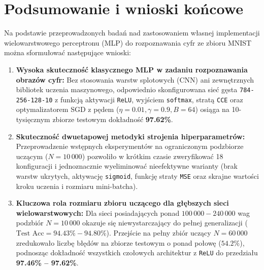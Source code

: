 \documentclass{article}
\begin{document}
\section{Podsumowanie i wnioski końcowe}

Na podstawie przeprowadzonych badań nad zastosowaniem własnej implementacji wielowarstwowego perceptronu (MLP) do rozpoznawania cyfr ze zbioru MNIST można sformułować następujące wnioski:
\begin{enumerate}
    \item \textbf{Wysoka skuteczność klasycznego MLP w zadaniu rozpoznawania obrazów cyfr:} Bez stosowania warstw splotowych (CNN) ani zewnętrznych bibliotek uczenia maszynowego, odpowiednio skonfigurowana sieć gęsta \texttt{784-256-128-10} z funkcją aktywacji \texttt{ReLU}, wyjściem \texttt{softmax}, stratą \texttt{CCE} oraz optymalizatorem SGD z pędem ($\eta = 0.01, \gamma = 0.9, B = 64$) osiąga na 10-tysięcznym zbiorze testowym dokładność \textbf{97.62\%}.
    \item \textbf{Skuteczność dwuetapowej metodyki strojenia hiperparametrów:} Przeprowadzenie wstępnych eksperymentów na ograniczonym podzbiorze uczącym ($N = 10\,000$) pozwoliło w krótkim czasie zweryfikować 18 konfiguracji i jednoznacznie wyeliminować nieefektywne warianty (brak warstw ukrytych, aktywację \texttt{sigmoid}, funkcję straty \texttt{MSE} oraz skrajne wartości kroku uczenia i rozmiaru mini-batcha).
    \item \textbf{Kluczowa rola rozmiaru zbioru uczącego dla głębszych sieci wielowarstwowych:} Dla sieci posiadających ponad $100\,000 - 240\,000$ wag podzbiór $N = 10\,000$ okazuje się niewystarczający do pełnej generalizacji ($\text{Test Acc} = 94.43\% - 94.80\%$). Przejście na pełny zbiór uczący $N = 60\,000$ zredukowało liczbę błędów na zbiorze testowym o ponad połowę ($54.2\%$), podnosząc dokładność wszystkich czołowych architektur z \texttt{ReLU} do przedziału \textbf{97.46\% -- 97.62\%}.
\end{enumerate}
\end{document}
